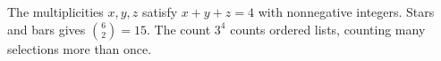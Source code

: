 The multiplicities $x,y,z$ satisfy $x+y+z=4$ with nonnegative integers. Stars and bars gives $\binom62=\boxed{15}$. The count $3^4$ counts ordered lists, counting many selections more than once.
